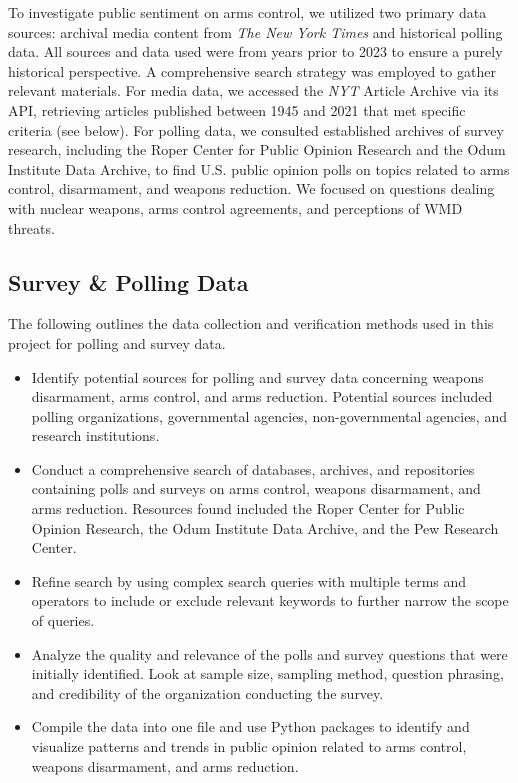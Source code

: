 \documentclass[11,5 pt]{article}
\begin{document}
    To investigate public sentiment on arms control, we utilized two primary data sources: archival media content from \textit{The New York Times} and historical polling data. All sources and data used were from years prior to 2023 to ensure a purely historical perspective. A comprehensive search strategy was employed to gather relevant materials. For media data, we accessed the \textit{NYT} Article Archive via its API, retrieving articles published between 1945 and 2021 that met specific criteria (see below). For polling data, we consulted established archives of survey research, including the Roper Center for Public Opinion Research and the Odum Institute Data Archive, to find U.S. public opinion polls on topics related to arms control, disarmament, and weapons reduction. We focused on questions dealing with nuclear weapons, arms control agreements, and perceptions of WMD threats.


\subsection{Survey \& Polling Data}

    The following outlines the data collection and verification methods used in this project for polling and survey data.
    
    \begin{itemize}
        \item Identify potential sources for polling and survey data concerning weapons disarmament, arms control, and arms reduction. Potential sources included polling organizations, governmental agencies, non-governmental agencies, and research institutions.
        \item Conduct a comprehensive search of databases, archives, and repositories containing polls and surveys on arms control, weapons disarmament, and arms reduction. Resources found included the Roper Center for Public Opinion Research, the Odum Institute Data Archive, and the Pew Research Center.
        \item Refine search by using complex search queries with multiple terms and operators to include or exclude relevant keywords to further narrow the scope of queries.
        \item Analyze the quality and relevance of the polls and survey questions that were initially identified. Look at sample size, sampling method, question phrasing, and credibility of the organization conducting the survey.
        \item Compile the data into one file and use Python packages to identify and visualize patterns and trends in public opinion related to arms control, weapons disarmament, and arms reduction.
    \end{itemize}
    
\end{document}
